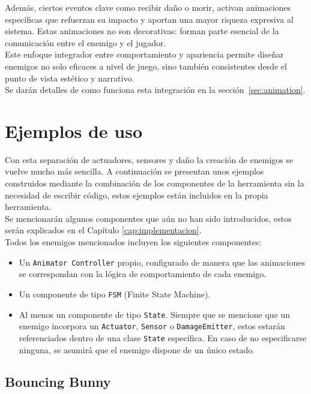 Además, ciertos eventos clave como recibir daño o morir, activan animaciones específicas que refuerzan su impacto y aportan una mayor riqueza expresiva al sistema. Estas animaciones no son decorativas: forman parte esencial de la comunicación entre el enemigo y el jugador.\\

Este enfoque integrador entre comportamiento y apariencia permite diseñar enemigos no solo eficaces a nivel de juego, sino también consistentes desde el punto de vista estético y narrativo.\\

Se darán detalles de como funciona esta integración en la sección~\ref{sec:animation}.
\section{Ejemplos de uso}
Con esta separación de actuadores, sensores y daño la creación de enemigos se vuelve mucho más sencilla. A continuación se presentan unos ejemplos construidos mediante la combinación de los componentes de la herramienta sin la necesidad de escribir código, estos ejemplos están incluidos en la propia herramienta.\\


Se mencionarán algunos componentes que aún no han sido introducidos, estos serán explicados en el Capítulo \ref{cap:implementacion}.\\


Todos los enemigos mencionados incluyen los siguientes componentes:

\begin{itemize}
\item Un \texttt{Animator Controller} propio, configurado de manera que las animaciones se correspondan con la lógica de comportamiento de cada enemigo.
\item Un componente de tipo \texttt{FSM} (Finite State Machine).
\item Al menos un componente de tipo \texttt{State}. Siempre que se mencione que un enemigo incorpora un \texttt{Actuator}, \texttt{Sensor} o \texttt{DamageEmitter}, estos estarán referenciados dentro de una clase \texttt{State} específica. En caso de no especificarse ninguna, se asumirá que el enemigo dispone de un único estado.
\end{itemize}

\subsection{Bouncing Bunny}


